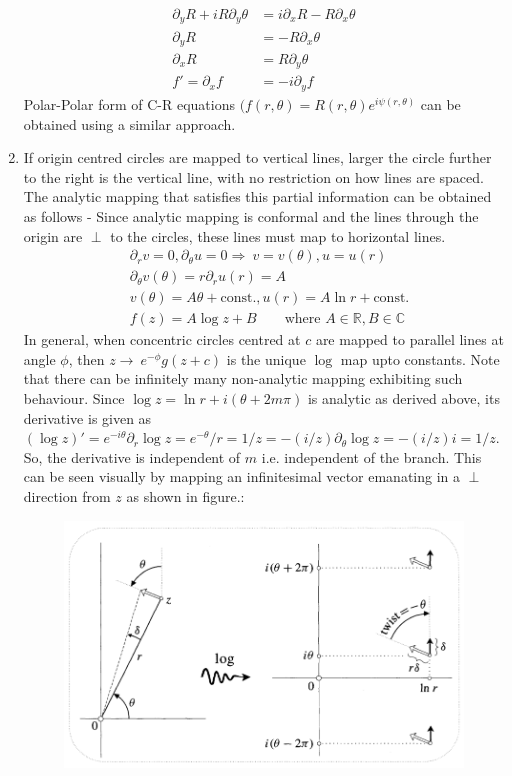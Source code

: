 \documentclass[12pt]{article}
\newcommand{\C}{\mathbb{C}}
\newcommand{\R}{\mathbb{R}}
\newcommand{\rto}{\rightarrow\ }
\newcommand{\Rto}{\Rightarrow\ }
\begin{document}
\begin{enumerate}
\begin{align*}
            \partial_{y}R  + iR\partial_{y}\theta &= i\partial_{x}R - R \partial_{x}\theta\\
            \partial_{y}R &= -R\partial_{x}\theta \\
            \partial_{x}R &= R\partial_{y}\theta\\
            f' = \partial_{x}f &= -i\partial_{y}f
        \end{align*}
        Polar-Polar form of C-R equations $(f(r,\theta) = R(r,\theta)e^{i\psi(r,\theta)}$ can be obtained using a similar approach.
        \item If origin centred circles are mapped to vertical lines, larger the circle further to the right is the vertical line, with no restriction on how lines are spaced. The analytic mapping that satisfies this partial information can be obtained as follows - Since analytic mapping is conformal and the lines through the origin are $\perp$ to the circles, these lines must map to horizontal lines.
        \begin{align*}
            &\partial_{r}v = 0, \partial_{\theta}u = 0 \Rto v = v(\theta), u = u(r)\\
            &\partial_{\theta}v(\theta) = r\partial_{r}u(r) = A\\
            &v(\theta) = A\theta + \text{const.}, u(r) = A\ln r + \text{const.}\\
            &f(z) = A\log z + B \qquad \text{where } A\in\R, B\in\C
        \end{align*}
        In general, when concentric circles centred at $c$ are mapped to parallel lines at angle $\phi$, then $z\rto e^{-\phi}g(z+c)$ is the unique $\log$ map upto constants. Note that there can be infinitely many non-analytic mapping exhibiting such behaviour. Since $\log z = \ln r + i(\theta + 2m\pi)$ is analytic as derived above, its derivative is given as $(\log z)' = e^{-i\theta}\partial_{r}\log z = e^{-\theta}/r = 1/z = -(i/z)\partial_{\theta}\log z = -(i/z)i = 1/z$. So, the derivative is independent of $m$ i.e. independent of the branch. This can be seen visually by mapping an infinitesimal vector emanating in a $\perp$ direction from $z$ as shown in figure.:
        \begin{figure}[h!]
            \centering
            \includegraphics[scale=0.75]{logz}

\end{figure}
\end{enumerate}
\end{document}
